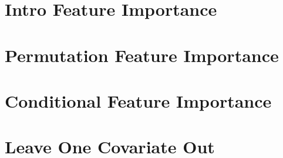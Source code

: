 \documentclass[11pt,compress,t,notes=noshow, aspectratio=169, xcolor=table]{beamer}
\begin{document}



% 
% 
% 

\section{Intro Feature Importance}


\section{Permutation Feature Importance}



\section{Conditional Feature Importance}


\section{Leave One Covariate Out}

\end{document}
